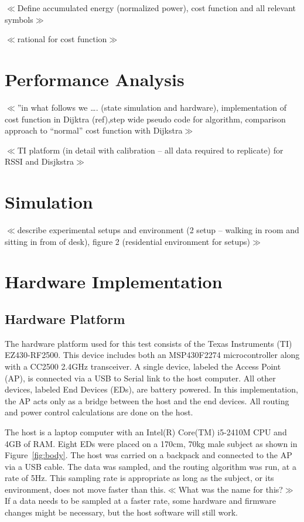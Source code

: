 \documentclass{article}
\begin{document}
$\ll$Define accumulated energy (normalized power), cost function and all relevant symbols$\gg$

$\ll$rational for cost function$\gg$

\section{Performance Analysis}
$\ll$”in what follows we …. (state simulation and hardware), implementation of cost function in Dijktra (ref),step wide pseudo code for algorithm, comparison approach to “normal” cost function with Dijkstra$\gg$

$\ll$TI platform (in detail with calibration – all data required to replicate) for RSSI and Disjkstra$\gg$

\section{Simulation}
$\ll$describe experimental setups and environment (2 setup – walking in room and sitting in from of desk), figure 2 (residential environment for setups)$\gg$

\section{Hardware Implementation}
\subsection{Hardware Platform}
The hardware platform used for this test consists of the Texas Instruments (TI) EZ430-RF2500. This device includes both an MSP430F2274 microcontroller along with a CC2500 2.4GHz transceiver. A single device, labeled the Access Point (AP), is connected via a USB to Serial link to the host computer. All other devices, labeled End Devices (EDs), are battery powered. In this implementation, the AP acts only as a bridge between the host and the end devices. All routing and power control calculations are done on the host.

The host is a laptop computer with an Intel(R) Core(TM) i5-2410M CPU and 4GB of RAM. Eight EDs were placed on a 170cm, 70kg male subject as shown in Figure~\ref{fig:body}. The host was carried on a backpack and connected to the AP via a USB cable. The data was sampled, and the routing algorithm was run, at a rate of 5Hz. This sampling rate is appropriate as long as the subject, or its environment, does not move faster than this.$\ll$What was the name for this?$\gg$ If a data needs to be sampled at a faster rate, some hardware and firmware changes might be necessary, but the host software will still work.
\end{document}

